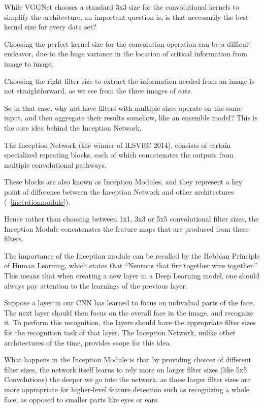 	\begin{bulletedlist}
		\item While VGGNet chooses a standard 3x3 size for the convolutional kernels to simplify the architecture, an important question is, is that necessarily the best kernel size for every data set?
		\item Choosing the perfect kernel size for the convolution operation can be a difficult endeavor, due to the huge variance in the location of critical information from image to image.
		\item Choosing the right filter size to extract the information needed from an image is not straightforward, as we see from the three images of cats.
		\item So in that case, why not have filters with multiple sizes operate on the same input, and then aggregate their results somehow, like an ensemble model?  This is the core idea behind the Inception Network.
		\item The Inception Network (the winner of ILSVRC 2014), consists of certain specialized repeating blocks, each of which concatenates the outputs from multiple convolutional pathways.
		\item These blocks are also known as Inception Modules, and they represent a key point of difference between the Inception Network and other architectures (\figurename~\ref{inceptionmodule}).
		\item Hence rather than choosing between 1x1, 3x3 or 5x5 convolutional filter sizes, the Inception Module concatenates the feature maps that are produced from these filters.
		\item The importance of the Inception module can be recalled by the Hebbian Principle of Human Learning, which states that ``Neurons that fire together wire together.'' This means that when creating a new layer in a Deep Learning model, one should always pay attention to the learnings of the previous layer.
		\item Suppose a layer in our CNN has learned to focus on individual parts of the face. The next layer should then focus on the overall face in the image, and recognize it. To perform this recognition, the layers should have the appropriate filter sizes for the recognition task of that layer.  The Inception Network, unlike other architectures of the time, provides scope for this idea.
		\item What happens in the Inception Module is that by providing choices of different filter sizes, the
network itself learns to rely more on larger filter sizes (like 5x5 Convolutions) the deeper we go into the network, as those larger filter sizes are more appropriate for higher-level feature detection such as recognizing a whole face, as opposed to smaller parts like eyes or ears.

\end{bulletedlist}
